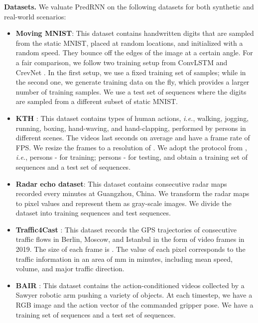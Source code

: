 \documentclass[10pt,journal,compsoc]{IEEEtran}
\newcommand{\myparagraph}[1]{\vspace{5pt} \noindent \textbf{#1.}}
\begin{document}
\myparagraph{Datasets} 
We valuate PredRNN on the following datasets for both synthetic and real-world scenarios:
\begin{itemize}[leftmargin=*]
    \item \textbf{Moving MNIST}: 
    This dataset contains handwritten digits that are sampled from the static MNIST, placed at random locations, and initialized with a random speed. They bounce off the edges of the image at a certain angle. For a fair comparison, we follow two training setup from ConvLSTM \cite{shi2015convolutional} and CrevNet \cite{yu2020efficient}. In the first setup, we use a fixed training set of  samples; while in the second one, we generate training data on the fly, which provides a larger number of training samples. We use a test set of  sequences where the digits are sampled from a different subset of static MNIST. 
    \item \textbf{KTH} \cite{Sch2004Recognizing}: This dataset contains  types of human actions, \textit{i.e.}, walking, jogging, running, boxing, hand-waving, and hand-clapping, performed by  persons in  different scenes. The videos last  seconds on average and have a frame rate of  FPS. We resize the frames to a resolution of . We adopt the protocol from \cite{Villegas2017Decomposing}, \textit{i.e.}, persons - for training; persons - for testing, and obtain a training set of  sequences and a test set of  sequences.
    \item \textbf{Radar echo dataset}: This dataset contains  consecutive radar maps recorded every  minutes at Guangzhou, China. We transform the radar maps to pixel values and represent them as  gray-scale images. We divide the dataset into  training sequences and  test sequences.
    \item \textbf{Traffic4Cast} \cite{Traffic4cast-web-2019}: This dataset records the GPS trajectories of consecutive traffic flows in Berlin, Moscow, and Istanbul in the form of video frames in 2019. The size of each frame is . The value of each pixel corresponds to the traffic information in an area of mm in  minutes, including mean speed, volume, and major traffic direction. 
    \item \textbf{BAIR} \cite{ebert2017self}: This dataset contains the action-conditioned videos collected by a Sawyer robotic arm pushing a variety of objects. At each timestep, we have a  RGB image and the action vector of the commanded gripper pose. We have a training set of  sequences and a test set of  sequences.
\end{itemize}
\end{document}
